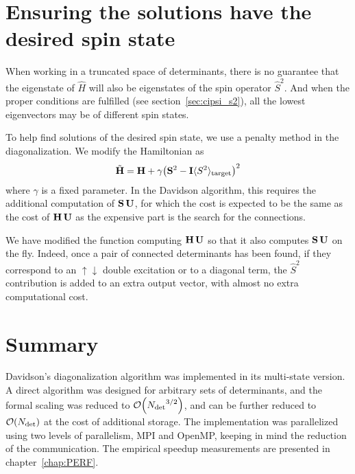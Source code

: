 \documentclass[./thesis.tex]{subfiles}
\begin{document}
\section{Ensuring the solutions have the desired spin state}

When working in a truncated space of determinants, there is no guarantee that the eigenstate of $\hat H$ will also be eigenstates of the spin operator $\hat S^2$. And when the proper conditions are fulfilled (see section~\ref{sec:cipsi_s2}), all the lowest eigenvectors may be of different spin states.

To help find solutions of the desired spin state, we use a penalty method in the diagonalization.\cite{Fales2017Sep} We modify the Hamiltonian as 
\begin{equation}
\tilde{\mathbf{H}} = \mathbf{H} + \gamma \qty( \mathbf{S}^2 - \mathbf{I} \langle S^2 \rangle_\text{target} )^2
\end{equation}
where $\gamma$ is a fixed parameter.
In the Davidson algorithm, this requires the additional computation of $\mathbf{S}\, \mathbf{U}$, for which the
cost is expected to be the same as the cost of $\mathbf{H} \, \mathbf{U}$ as the expensive part is the search for the
connections.

We have modified the function computing $\mathbf{H} \, \mathbf{U}$ so that it also computes $\mathbf{S}\, \mathbf{U}$ on the fly.
Indeed, once a pair of connected determinants has been found, if they correspond to an $\uparrow \downarrow$ double excitation or to a diagonal term, the $\hat S^2$ contribution is added to an extra output vector,
with almost no extra computational cost.

\section{Summary}

Davidson's diagonalization algorithm was implemented in its multi-state
version. A direct algorithm was designed for arbitrary sets of determinants, and the
formal scaling was reduced to $\order{\Ndet^{3/2}}$, and can be further reduced to $\order{\Ndet}$
at the cost of additional storage. The implementation was parallelized
using two levels of parallelism, MPI and OpenMP, keeping in mind the reduction
of the communication. The empirical speedup measurements are presented in
chapter~\ref{chap:PERF}.
\end{document}
